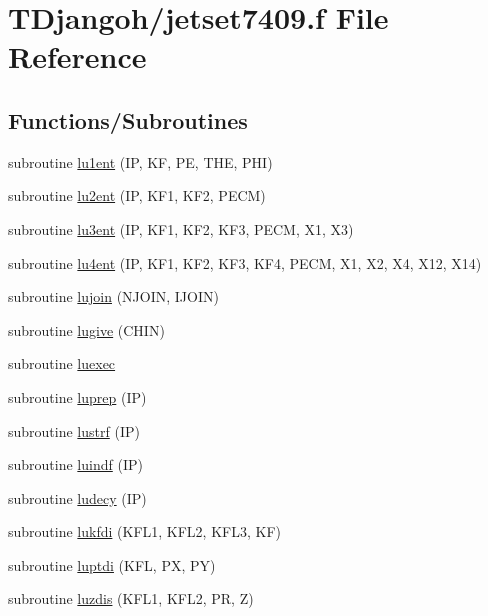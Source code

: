\hypertarget{jetset7409_8f}{\section{T\+Djangoh/jetset7409.f File Reference}
\label{jetset7409_8f}
}
\subsection*{Functions/\+Subroutines}
\begin{DoxyCompactItemize}
\item 
subroutine \hyperlink{jetset7409_8f_a86278289cc543712468eeffdc4735d47}{lu1ent} (I\+P, K\+F, P\+E, T\+H\+E, P\+H\+I)
\item 
subroutine \hyperlink{jetset7409_8f_af39d115696df4bbd1a85af522582079b}{lu2ent} (I\+P, K\+F1, K\+F2, P\+E\+C\+M)
\item 
subroutine \hyperlink{jetset7409_8f_a9286761f10ca7de813e25e275d46c1f6}{lu3ent} (I\+P, K\+F1, K\+F2, K\+F3, P\+E\+C\+M, X1, X3)
\item 
subroutine \hyperlink{jetset7409_8f_a6afb1abf3d0ab5082a468f71d57c453d}{lu4ent} (I\+P, K\+F1, K\+F2, K\+F3, K\+F4, P\+E\+C\+M, X1, X2, X4, X12, X14)
\item 
subroutine \hyperlink{jetset7409_8f_a45012f3eb334e330854541b974894d86}{lujoin} (N\+J\+O\+I\+N, I\+J\+O\+I\+N)
\item 
subroutine \hyperlink{jetset7409_8f_a4f22ba9fbddac5867a0bcc565e521513}{lugive} (C\+H\+I\+N)
\item 
subroutine \hyperlink{jetset7409_8f_a5b4b744833efbda90c865012826ff281}{luexec}
\item 
subroutine \hyperlink{jetset7409_8f_aad1b09d3910be6e5fd985cf9a9860fc5}{luprep} (I\+P)
\item 
subroutine \hyperlink{jetset7409_8f_a5941611caddf798b636f4885a175c69e}{lustrf} (I\+P)
\item 
subroutine \hyperlink{jetset7409_8f_a0eb013ccdb0ba3b352ebfd4ed8aafa72}{luindf} (I\+P)
\item 
subroutine \hyperlink{jetset7409_8f_ac4ce13e6008631f348288f05b28e3df9}{ludecy} (I\+P)
\item 
subroutine \hyperlink{jetset7409_8f_a46954bb4ec2e8b9e55b3dd72f4b8df11}{lukfdi} (K\+F\+L1, K\+F\+L2, K\+F\+L3, K\+F)
\item 
subroutine \hyperlink{jetset7409_8f_adec49ca8d72a0d30c298eb014457d5fd}{luptdi} (K\+F\+L, P\+X, P\+Y)
\item 
subroutine \hyperlink{jetset7409_8f_a3e0cdb14807014a4c99bc53b92ae4fe4}{luzdis} (K\+F\+L1, K\+F\+L2, P\+R, Z)

\end{DoxyCompactItemize}
